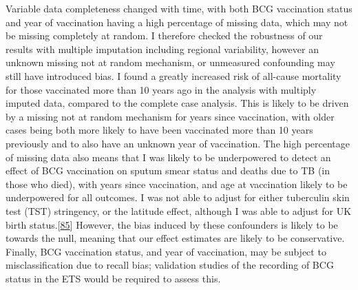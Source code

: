 \documentclass[11pt,twoside]{bristolthesis}
\begin{document}
  Variable data completeness changed with time, with both BCG vaccination status and year of vaccination having a high percentage of missing data, which may not be missing completely at random. I therefore checked the robustness of our results with multiple imputation including regional variability, however an unknown missing not at random mechanism, or unmeasured confounding may still have introduced bias. I found a greatly increased risk of all-cause mortality for those vaccinated more than 10 years ago in the analysis with multiply imputed data, compared to the complete case analysis. This is likely to be driven by a missing not at random mechanism for years since vaccination, with older cases being both more likely to have been vaccinated more than 10 years previously and to also have an unknown year of vaccination. The high percentage of missing data also means that I was likely to be underpowered to detect an effect of BCG vaccination on sputum smear status and deaths due to TB (in those who died), with years since vaccination, and age at vaccination likely to be underpowered for all outcomes. I was not able to adjust for either tuberculin skin test (TST) stringency, or the latitude effect, although I was able to adjust for UK birth status.{[}\protect\hyperlink{ref-Roy2014b}{85}{]} However, the bias induced by these confounders is likely to be towards the null, meaning that our effect estimates are likely to be conservative. Finally, BCG vaccination status, and year of vaccination, may be subject to misclassification due to recall bias; validation studies of the recording of BCG status in the ETS would be required to assess this.
  
\end{document}
